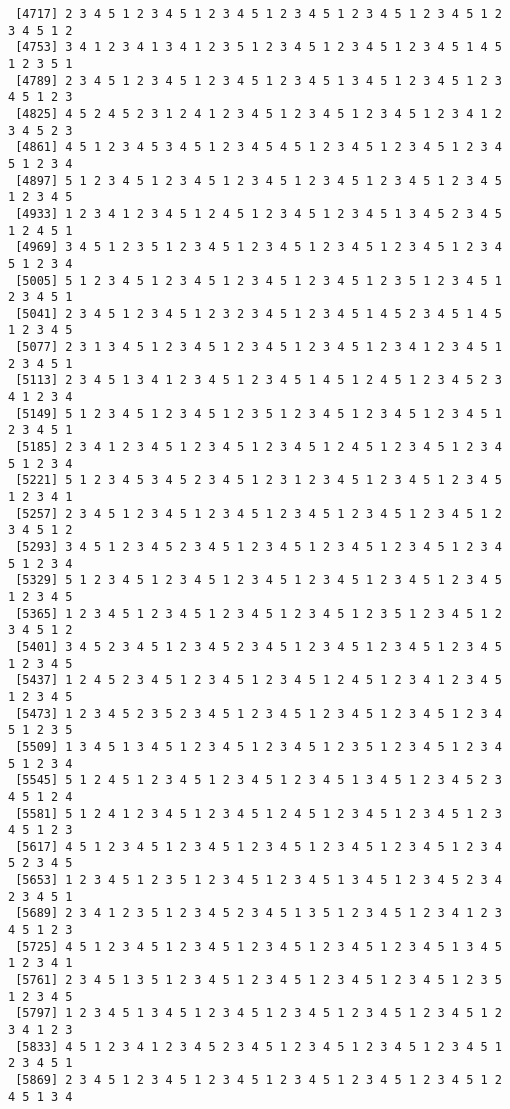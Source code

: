 \documentclass[
  11pt,
]{book}
\begin{document}
\begin{verbatim}
 [4717] 2 3 4 5 1 2 3 4 5 1 2 3 4 5 1 2 3 4 5 1 2 3 4 5 1 2 3 4 5 1 2 3 4 5 1 2
 [4753] 3 4 1 2 3 4 1 3 4 1 2 3 5 1 2 3 4 5 1 2 3 4 5 1 2 3 4 5 1 4 5 1 2 3 5 1
 [4789] 2 3 4 5 1 2 3 4 5 1 2 3 4 5 1 2 3 4 5 1 3 4 5 1 2 3 4 5 1 2 3 4 5 1 2 3
 [4825] 4 5 2 4 5 2 3 1 2 4 1 2 3 4 5 1 2 3 4 5 1 2 3 4 5 1 2 3 4 1 2 3 4 5 2 3
 [4861] 4 5 1 2 3 4 5 3 4 5 1 2 3 4 5 4 5 1 2 3 4 5 1 2 3 4 5 1 2 3 4 5 1 2 3 4
 [4897] 5 1 2 3 4 5 1 2 3 4 5 1 2 3 4 5 1 2 3 4 5 1 2 3 4 5 1 2 3 4 5 1 2 3 4 5
 [4933] 1 2 3 4 1 2 3 4 5 1 2 4 5 1 2 3 4 5 1 2 3 4 5 1 3 4 5 2 3 4 5 1 2 4 5 1
 [4969] 3 4 5 1 2 3 5 1 2 3 4 5 1 2 3 4 5 1 2 3 4 5 1 2 3 4 5 1 2 3 4 5 1 2 3 4
 [5005] 5 1 2 3 4 5 1 2 3 4 5 1 2 3 4 5 1 2 3 4 5 1 2 3 5 1 2 3 4 5 1 2 3 4 5 1
 [5041] 2 3 4 5 1 2 3 4 5 1 2 3 2 3 4 5 1 2 3 4 5 1 4 5 2 3 4 5 1 4 5 1 2 3 4 5
 [5077] 2 3 1 3 4 5 1 2 3 4 5 1 2 3 4 5 1 2 3 4 5 1 2 3 4 1 2 3 4 5 1 2 3 4 5 1
 [5113] 2 3 4 5 1 3 4 1 2 3 4 5 1 2 3 4 5 1 4 5 1 2 4 5 1 2 3 4 5 2 3 4 1 2 3 4
 [5149] 5 1 2 3 4 5 1 2 3 4 5 1 2 3 5 1 2 3 4 5 1 2 3 4 5 1 2 3 4 5 1 2 3 4 5 1
 [5185] 2 3 4 1 2 3 4 5 1 2 3 4 5 1 2 3 4 5 1 2 4 5 1 2 3 4 5 1 2 3 4 5 1 2 3 4
 [5221] 5 1 2 3 4 5 3 4 5 2 3 4 5 1 2 3 1 2 3 4 5 1 2 3 4 5 1 2 3 4 5 1 2 3 4 1
 [5257] 2 3 4 5 1 2 3 4 5 1 2 3 4 5 1 2 3 4 5 1 2 3 4 5 1 2 3 4 5 1 2 3 4 5 1 2
 [5293] 3 4 5 1 2 3 4 5 2 3 4 5 1 2 3 4 5 1 2 3 4 5 1 2 3 4 5 1 2 3 4 5 1 2 3 4
 [5329] 5 1 2 3 4 5 1 2 3 4 5 1 2 3 4 5 1 2 3 4 5 1 2 3 4 5 1 2 3 4 5 1 2 3 4 5
 [5365] 1 2 3 4 5 1 2 3 4 5 1 2 3 4 5 1 2 3 4 5 1 2 3 5 1 2 3 4 5 1 2 3 4 5 1 2
 [5401] 3 4 5 2 3 4 5 1 2 3 4 5 2 3 4 5 1 2 3 4 5 1 2 3 4 5 1 2 3 4 5 1 2 3 4 5
 [5437] 1 2 4 5 2 3 4 5 1 2 3 4 5 1 2 3 4 5 1 2 4 5 1 2 3 4 1 2 3 4 5 1 2 3 4 5
 [5473] 1 2 3 4 5 2 3 5 2 3 4 5 1 2 3 4 5 1 2 3 4 5 1 2 3 4 5 1 2 3 4 5 1 2 3 5
 [5509] 1 3 4 5 1 3 4 5 1 2 3 4 5 1 2 3 4 5 1 2 3 5 1 2 3 4 5 1 2 3 4 5 1 2 3 4
 [5545] 5 1 2 4 5 1 2 3 4 5 1 2 3 4 5 1 2 3 4 5 1 3 4 5 1 2 3 4 5 2 3 4 5 1 2 4
 [5581] 5 1 2 4 1 2 3 4 5 1 2 3 4 5 1 2 4 5 1 2 3 4 5 1 2 3 4 5 1 2 3 4 5 1 2 3
 [5617] 4 5 1 2 3 4 5 1 2 3 4 5 1 2 3 4 5 1 2 3 4 5 1 2 3 4 5 1 2 3 4 5 2 3 4 5
 [5653] 1 2 3 4 5 1 2 3 5 1 2 3 4 5 1 2 3 4 5 1 3 4 5 1 2 3 4 5 2 3 4 2 3 4 5 1
 [5689] 2 3 4 1 2 3 5 1 2 3 4 5 2 3 4 5 1 3 5 1 2 3 4 5 1 2 3 4 1 2 3 4 5 1 2 3
 [5725] 4 5 1 2 3 4 5 1 2 3 4 5 1 2 3 4 5 1 2 3 4 5 1 2 3 4 5 1 3 4 5 1 2 3 4 1
 [5761] 2 3 4 5 1 3 5 1 2 3 4 5 1 2 3 4 5 1 2 3 4 5 1 2 3 4 5 1 2 3 5 1 2 3 4 5
 [5797] 1 2 3 4 5 1 3 4 5 1 2 3 4 5 1 2 3 4 5 1 2 3 4 5 1 2 3 4 5 1 2 3 4 1 2 3
 [5833] 4 5 1 2 3 4 1 2 3 4 5 2 3 4 5 1 2 3 4 5 1 2 3 4 5 1 2 3 4 5 1 2 3 4 5 1
 [5869] 2 3 4 5 1 2 3 4 5 1 2 3 4 5 1 2 3 4 5 1 2 3 4 5 1 2 3 4 5 1 2 4 5 1 3 4

\end{verbatim}
\end{document}
